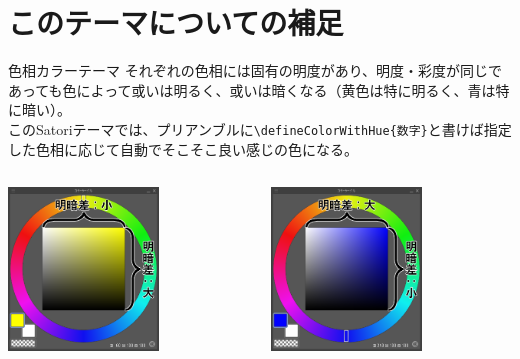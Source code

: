 \documentclass[
    aspectratio=169,   %
    xcolor={           %
        rgb,           %
        svgnames},     %
    unicode,           %
    12pt,              %
    unknownkeysallowed %
]{beamer}
\begin{document}
\section{このテーマについての補足}

\begin{frame}[fragile]{色相カラーテーマ}
  それぞれの色相には固有の明度があり、明度・彩度が同じであっても色によって或いは明るく、或いは暗くなる（黄色は特に明るく、青は特に暗い）。\\
  このSatoriテーマでは、プリアンブルに\lstinline|\defineColorWithHue{数字}|と書けば指定した色相に応じて自動でそこそこ良い感じの色になる。\\
  \vspace{10pt}
  \begin{columns}[c, onlytextwidth]
    \begin{column}{.48\textwidth}
      \centering
      \includegraphics[width=4cm]{png/yellow.png}
    \end{column}
    \begin{column}{.48\textwidth}
      \centering
      \includegraphics[width=4cm]{png/blue.png}
    \end{column}
  \end{columns}
\end{frame}
\end{document}
